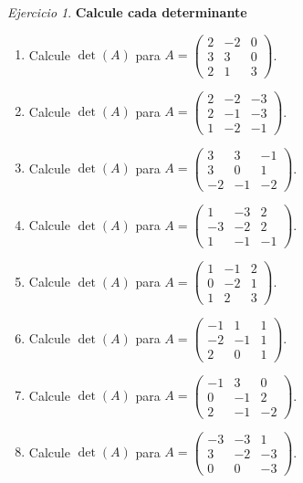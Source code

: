 \documentclass[12pt]{article}
\theoremstyle{remark}
\newtheorem{Ejer}[definicion]{Ejercicio}
\begin{document}
\begin{Ejer}

\textbf{Calcule cada determinante }
\begin{enumerate}[resume=banco]

\item Calcule $\det(A)$ para $A=\begin{pmatrix}2&-2&0\\3&3&0\\2&1&3\end{pmatrix}$.

\item Calcule $\det(A)$ para $A=\begin{pmatrix}2&-2&-3\\2&-1&-3\\1&-2&-1\end{pmatrix}$.

\item Calcule $\det(A)$ para $A=\begin{pmatrix}3&3&-1\\3&0&1\\-2&-1&-2\end{pmatrix}$.

\item Calcule $\det(A)$ para $A=\begin{pmatrix}1&-3&2\\-3&-2&2\\1&-1&-1\end{pmatrix}$.

\item Calcule $\det(A)$ para $A=\begin{pmatrix}1&-1&2\\0&-2&1\\1&2&3\end{pmatrix}$.

\item Calcule $\det(A)$ para $A=\begin{pmatrix}-1&1&1\\-2&-1&1\\2&0&1\end{pmatrix}$.

\item Calcule $\det(A)$ para $A=\begin{pmatrix}-1&3&0\\0&-1&2\\2&-1&-2\end{pmatrix}$.

\item Calcule $\det(A)$ para $A=\begin{pmatrix}-3&-3&1\\3&-2&-3\\0&0&-3\end{pmatrix}$.


\end{enumerate}
\end{Ejer}
\end{document}
